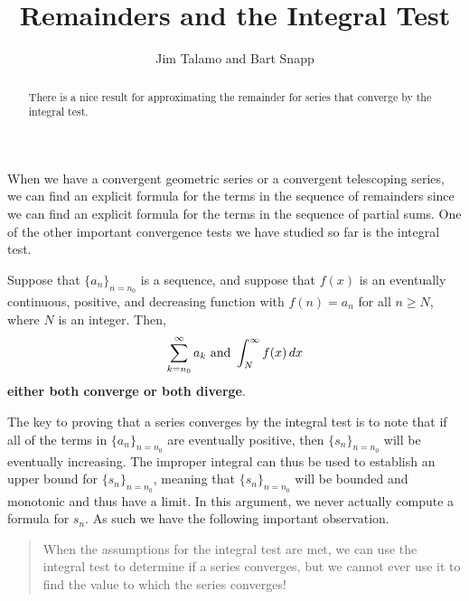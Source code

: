 \documentclass{ximera}
\title[Dig-In:]{Remainders and the Integral Test}
\author{Jim Talamo and Bart Snapp}
\begin{document}
\begin{abstract}
There is a nice result for approximating the remainder for series that converge by the integral test. 
\end{abstract}
\maketitle

When we have a convergent geometric series or a convergent telescoping series, we can find an explicit formula for the terms in the sequence of remainders since we can find an explicit formula for the terms in the sequence of partial sums.  One of the other important convergence tests we have studied so far is the integral test.

\begin{theorem}
  Suppose that $\{a_n\}_{n=n_0}$ is a sequence, and suppose that $f(x)$ is an eventually continuous, positive, and decreasing function
    with $f(n)=a_n$ for all $n \geq N$, where $N$ is an integer.  Then, 
    \[
    \sum_{k=n_0}^\infty a_k\text{ and }\int_N^\infty f(x) \mathop{}\!d x
    \]
    \textbf{either both converge or both diverge}.
\end{theorem}

The key to proving that a series converges by the integral test is to note that if all of the terms in $\{a_n\}_{n=n_0}$ are eventually positive, then $\{s_n\}_{n=n_0}$ will be eventually increasing.  The improper integral can thus be used to establish an upper bound for $\{s_n\}_{n=n_0}$, meaning that $\{s_n\}_{n=n_0}$ will be bounded and monotonic and thus have a limit.  In this argument, we never actually compute a formula for $s_n$.  As such we have the following important observation. 
  
\begin{quote}
When the assumptions for the integral test are met, we can use the integral test to determine if a series converges, but we cannot ever use it to find the value to which the series converges!
\end{quote}
\end{document}
